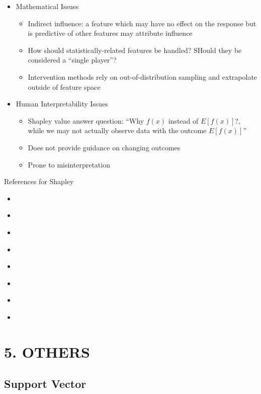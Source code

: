 \documentclass[
]{book}
\begin{document}
\begin{itemize}
\item
  Mathematical Issues

  \begin{itemize}
  \item
    Indirect influence: a feature which may have no effect on the response but is predictive of other features may attribute influence
  \item
    How should statistically-related features be handled? SHould they be considered a ``single player''?
  \item
    Intervention methods rely on out-of-distribution sampling and extrapolate outside of feature space
  \end{itemize}
\item
  Human Interpretability Issues

  \begin{itemize}
  \item
    Shapley value answer question: ``Why \(f(x)\) instead of \(E[f(x)]\)?, while we may not actually observe data with the outcome \(E[f(x)]\)''
  \item
    Does not provide guidance on changing outcomes
  \item
    Prone to misinterpretation
  \end{itemize}
\end{itemize}

References for Shapley

\begin{itemize}
\item
  \citet{datta2016}
\item
  \citet{kumar2020problems}
\item
  \citet{lipovetsky2001a}
\item
  \citet{lundberg2018consistent}
\item
  \citet{lundberg2017unified}
\item
  \citet{merrick2020explanation}
\item
  \citet{trumbelj2013}
\item
  \citet{sundararajan2020many}
\end{itemize}

\hypertarget{part-5.-others}{%
\part{5. OTHERS}\label{part-5.-others}}

\hypertarget{support-vector}{%
\chapter{Support Vector}\label{support-vector}}
\end{document}
